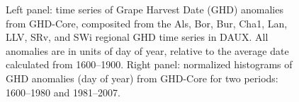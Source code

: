 \documentclass[final]{nature}
\begin{document}


\begin{figure}
\caption{Left panel: time series of Grape Harvest Date (GHD) anomalies from GHD-Core, composited from the Als, Bor, Bur, Cha1, Lan, LLV, SRv, and SWi regional GHD time series in DAUX. All anomalies are in units of day of year, relative to the average date calculated from 1600--1900. Right panel: normalized histograms of GHD anomalies (day of year) from GHD-Core for two periods: 1600--1980 and 1981--2007.}
\end{figure}
\end{document}
